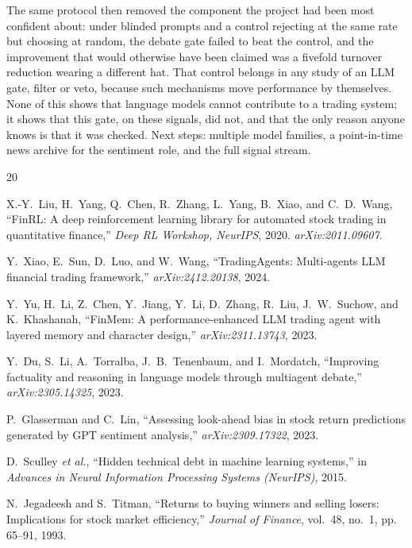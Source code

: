\documentclass[conference]{IEEEtran}
\begin{document}
The same protocol then removed the component the project had been most
confident about: under blinded prompts and a control rejecting at the same rate
but choosing at random, the debate gate failed to beat the control, and the
improvement that would otherwise have been claimed was a fivefold turnover
reduction wearing a different hat. That control belongs in any study of an LLM
gate, filter or veto, because such mechanisms move performance by themselves.
None of this shows that language models cannot contribute to a trading system;
it shows that this gate, on these signals, did not, and that the only reason
anyone knows is that it was checked. Next steps: multiple model families, a
point-in-time news archive for the sentiment role, and the full signal stream.

\begin{thebibliography}{20}
\setlength{\itemsep}{0pt plus 0.3pt}

X.-Y.~Liu, H.~Yang, Q.~Chen, R.~Zhang, L.~Yang, B.~Xiao, and C.~D.~Wang,
``FinRL: A deep reinforcement learning library for automated stock trading in
quantitative finance,'' \emph{Deep RL Workshop, NeurIPS}, 2020.
\emph{arXiv:2011.09607}.

Y.~Xiao, E.~Sun, D.~Luo, and W.~Wang, ``TradingAgents: Multi-agents LLM
financial trading framework,'' \emph{arXiv:2412.20138}, 2024.

Y.~Yu, H.~Li, Z.~Chen, Y.~Jiang, Y.~Li, D.~Zhang, R.~Liu, J.~W.~Suchow, and
K.~Khashanah, ``FinMem: A performance-enhanced LLM trading agent with layered
memory and character design,'' \emph{arXiv:2311.13743}, 2023.

Y.~Du, S.~Li, A.~Torralba, J.~B.~Tenenbaum, and I.~Mordatch, ``Improving
factuality and reasoning in language models through multiagent debate,''
\emph{arXiv:2305.14325}, 2023.

P.~Glasserman and C.~Lin, ``Assessing look-ahead bias in stock return
predictions generated by GPT sentiment analysis,'' \emph{arXiv:2309.17322},
2023.

D.~Sculley \emph{et al.}, ``Hidden technical debt in machine learning
systems,'' in \emph{Advances in Neural Information Processing Systems
(NeurIPS)}, 2015.

N.~Jegadeesh and S.~Titman, ``Returns to buying winners and selling losers:
Implications for stock market efficiency,'' \emph{Journal of Finance},
vol.~48, no.~1, pp. 65--91, 1993.


\end{thebibliography}
\end{document}
